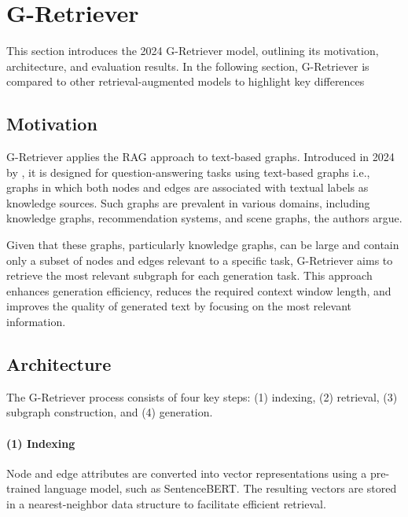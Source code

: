 \section{G-Retriever}

This section introduces the 2024 G-Retriever model, outlining its motivation, architecture, and evaluation results.
In the following section, G-Retriever is compared to other retrieval-augmented models to highlight key differences

\subsection{Motivation}
G-Retriever applies the RAG approach to text-based graphs.
Introduced in 2024 by \cite{g-retriever}, it is designed for question-answering tasks using text-based graphs \textemdash i.e., graphs in which both nodes and edges are associated with textual labels \textemdash as knowledge sources. Such graphs are prevalent in various domains, including knowledge graphs, recommendation systems, and scene graphs, the authors argue.

Given that these graphs, particularly knowledge graphs, can be large and contain only a subset of nodes and edges relevant to a specific task, G-Retriever aims to retrieve the most relevant subgraph for each generation task.
This approach enhances generation efficiency, reduces the required context window length, and improves the quality of generated text by focusing on the most relevant information.

\subsection{Architecture}

The G-Retriever process consists of four key steps: (1) indexing, (2) retrieval, (3) subgraph construction, and (4) generation.

\paragraph{(1) Indexing} Node and edge attributes are converted into vector representations using a pre-trained language model, such as SentenceBERT. The resulting vectors are stored in a nearest-neighbor data structure to facilitate efficient retrieval.

